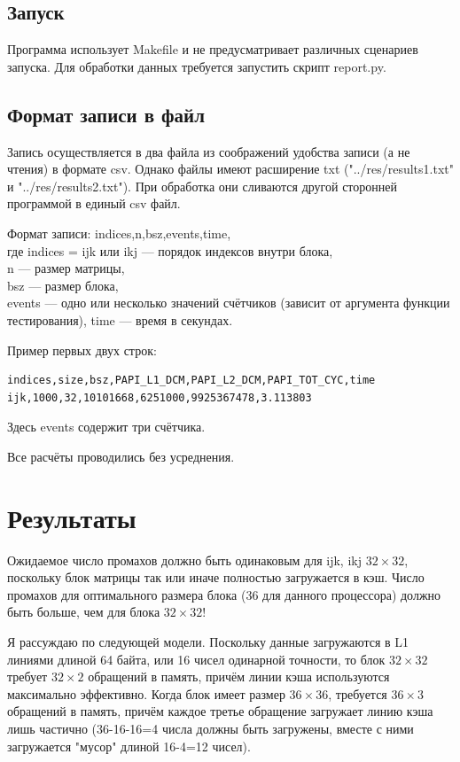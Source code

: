 \documentclass[14pt]{extarticle}
\begin{document}
\subsection*{Запуск}
Программа использует Makefile и не предусматривает различных сценариев запуска.
Для обработки данных требуется запустить скрипт report.py.

\subsection*{Формат записи в файл}
Запись осуществляется в два файла из соображений удобства записи (а не чтения) в формате csv. Однако файлы имеют расширение txt ("../res/results1.txt" и "../res/results2.txt"). При обработка они сливаются другой сторонней программой в единый csv файл.

Формат записи: indices,n,bsz,events,time,\\
где indices = ijk или ikj --- порядок индексов внутри блока,\\
n --- размер матрицы,\\
bsz --- размер блока,\\
events --- одно или несколько значений счётчиков (зависит от аргумента функции тестирования),
time --- время в секундах.

Пример первых двух строк:
\begin{lstlisting}
indices,size,bsz,PAPI_L1_DCM,PAPI_L2_DCM,PAPI_TOT_CYC,time
ijk,1000,32,10101668,6251000,9925367478,3.113803
\end{lstlisting}
Здесь events содержит три счётчика.

Все расчёты проводились без усреднения.



\section*{Результаты}
Ожидаемое число промахов должно быть одинаковым для ijk, ikj $32 \times 32$, поскольку блок матрицы так или иначе полностью загружается в кэш. Число промахов для оптимального размера блока (36 для данного процессора) должно быть больше, чем для блока $32 \times 32$!

Я рассуждаю по следующей модели. Поскольку данные загружаются в L1 линиями длиной 64 байта, или 16 чисел одинарной точности, то блок $32 \times 32$ требует $32 \times 2$ обращений в память, причём линии кэша используются максимально эффективно. Когда блок имеет размер $36 \times 36$, требуется $36 \times 3$ обращений в память, причём каждое третье обращение загружает линию кэша лишь частично (36-16-16=4 числа должны быть загружены, вместе с ними загружается "мусор" длиной 16-4=12 чисел).
\end{document}
